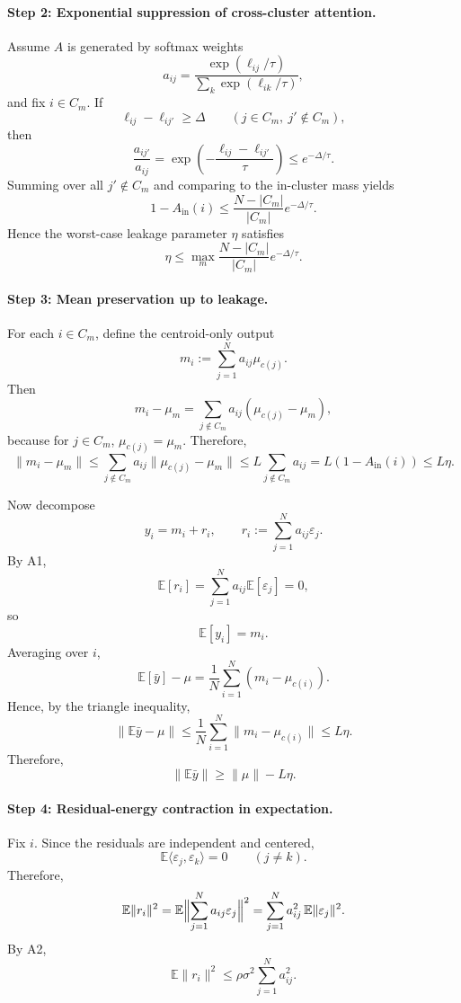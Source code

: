 \paragraph{Step 2: Exponential suppression of cross-cluster attention.}

Assume $A$ is generated by softmax weights
\[
a_{ij} = \frac{\exp(\ell_{ij}/\tau)}{\sum_k \exp(\ell_{ik}/\tau)},
\]
and fix $i\in C_m$. If
\[
\ell_{ij} - \ell_{ij'} \ge \Delta
\qquad
(j\in C_m,\ j'\notin C_m),
\]
then
\[
\frac{a_{ij'}}{a_{ij}}
=
\exp\!\left(-\frac{\ell_{ij}-\ell_{ij'}}{\tau}\right)
\le
e^{-\Delta/\tau}.
\]
Summing over all $j'\notin C_m$ and comparing to the in-cluster mass yields
\[
1 - A_{\mathrm{in}}(i)
\le
\frac{N-|C_m|}{|C_m|} e^{-\Delta/\tau}.
\]
Hence the worst-case leakage parameter $\eta$ satisfies
\[
\eta \le \max_m \frac{N-|C_m|}{|C_m|} e^{-\Delta/\tau}.
\]

\paragraph{Step 3: Mean preservation up to leakage.}

For each $i\in C_m$, define the centroid-only output
\[
m_i := \sum_{j=1}^N a_{ij}\mu_{c(j)}.
\]
Then
\[
m_i - \mu_m
=
\sum_{j\notin C_m} a_{ij}(\mu_{c(j)}-\mu_m),
\]
because for $j\in C_m$, $\mu_{c(j)}=\mu_m$.
Therefore,
\[
\|m_i-\mu_m\|
\le
\sum_{j\notin C_m} a_{ij}\|\mu_{c(j)}-\mu_m\|
\le
L\sum_{j\notin C_m} a_{ij}
=
L(1-A_{\mathrm{in}}(i))
\le
L\eta.
\]

Now decompose
\[
y_i = m_i + r_i,
\qquad
r_i := \sum_{j=1}^N a_{ij}\varepsilon_j.
\]
By A1,
\[
\mathbb{E}[r_i] = \sum_{j=1}^N a_{ij}\mathbb{E}[\varepsilon_j] = 0,
\]
so
\[
\mathbb{E}[y_i] = m_i.
\]
Averaging over $i$,
\[
\mathbb{E}[\bar{y}] - \mu
=
\frac{1}{N}\sum_{i=1}^N (m_i - \mu_{c(i)}).
\]
Hence, by the triangle inequality,
\[
\|\mathbb{E}\bar{y} - \mu\|
\le
\frac{1}{N}\sum_{i=1}^N \|m_i-\mu_{c(i)}\|
\le
L\eta.
\]
Therefore,
\[
\|\mathbb{E}\bar{y}\| \ge \|\mu\| - L\eta.
\]

\paragraph{Step 4: Residual-energy contraction in expectation.}

Fix $i$. Since the residuals are independent and centered,
\[
\mathbb{E}\langle \varepsilon_j,\varepsilon_k\rangle = 0
\qquad (j\neq k).
\]
Therefore,
\[
\mathbb{E}\|r_i\|^2
=
\mathbb{E}\Bigl\|
\sum_{j=1}^N a_{ij}\varepsilon_j
\Bigr\|^2
=
\sum_{j=1}^N a_{ij}^2 \,\mathbb{E}\|\varepsilon_j\|^2.
\]
By A2,
\[
\mathbb{E}\|r_i\|^2
\le
\rho \sigma^2 \sum_{j=1}^N a_{ij}^2.
\]

